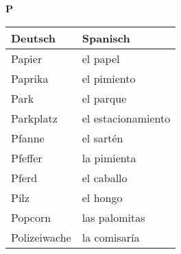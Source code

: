 \begin{flushright}\begin{Huge}\textbf{P}\end{Huge}\end{flushright}

\begin{longtable}{p{} p{}} 
\textbf{Deutsch}     & \textbf{Spanisch}                                       \\ \hline
\hline
\endhead %
Papier & el papel \\
Paprika & el pimiento\\
Park & el parque \\
Parkplatz & el estacionamiento \\
Pfanne & el sartén\\
Pfeffer & la pimienta\\
Pferd & el caballo\\
Pilz & el hongo\\
Popcorn & las palomitas\\
Polizeiwache & la comisaría\\ 
\end{longtable}
